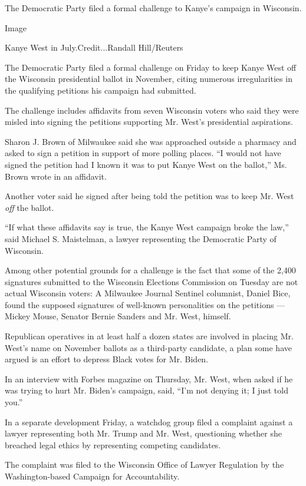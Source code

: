 The Democratic Party filed a formal challenge to Kanye's campaign in
Wisconsin.

Image

Kanye West in July.Credit...Randall Hill/Reuters

The Democratic Party filed a formal challenge on Friday to keep Kanye
West off the Wisconsin presidential ballot in November, citing numerous
irregularities in the qualifying petitions his campaign had submitted.

The challenge includes affidavits from seven Wisconsin voters who said
they were misled into signing the petitions supporting Mr. West's
presidential aspirations.

Sharon J. Brown of Milwaukee said she was approached outside a pharmacy
and asked to sign a petition in support of more polling places. ``I
would not have signed the petition had I known it was to put Kanye West
on the ballot,'' Ms. Brown wrote in an affidavit.

Another voter said he signed after being told the petition was to keep
Mr. West \emph{off} the ballot.

``If what these affidavits say is true, the Kanye West campaign broke
the law,'' said Michael S. Maistelman, a lawyer representing the
Democratic Party of Wisconsin.

Among other potential grounds for a challenge is the fact that some of
the 2,400 signatures submitted to the Wisconsin Elections Commission on
Tuesday are not actual Wisconsin voters: A Milwaukee Journal Sentinel
columnist, Daniel Bice, found the supposed signatures of well-known
personalities on the petitions --- Mickey Mouse, Senator Bernie Sanders
and Mr. West, himself.

Republican operatives in at least half a dozen states are involved in
placing Mr. West's name on November ballots as a third-party candidate,
a plan some have argued is an effort to depress Black votes for Mr.
Biden.

In an interview with Forbes magazine on Thursday, Mr. West, when asked
if he was trying to hurt Mr. Biden's campaign, said, ``I'm not denying
it; I just told you.''

In a separate development Friday, a watchdog group filed a complaint
against a lawyer representing both Mr. Trump and Mr. West, questioning
whether she breached legal ethics by representing competing candidates.

The complaint was filed to the Wisconsin Office of Lawyer Regulation by
the Washington-based Campaign for Accountability.

